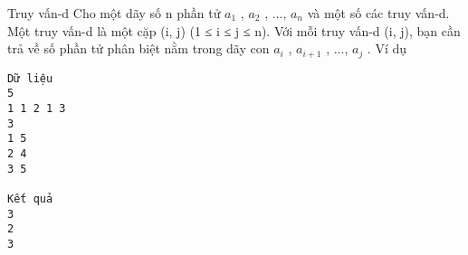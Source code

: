 Truy vấn-d
Cho một dãy số n phần tử $a_{1}$   ,   $a_{2}$   , ..., $a_{n}$   và một số các truy vấn-d. Một truy vấn-d là một cặp (i, j) (1 ≤ i   ≤ j ≤ n). Với mỗi truy vấn-d (i, j), bạn cần trả về số phần   tử phân biệt nằm trong dãy con $a_{i}$   ,   $a_{i+1}$   , ..., $a_{j}$   .
Ví dụ
\begin{verbatim}
Dữ liệu
5
1 1 2 1 3
3
1 5
2 4
3 5

Kết quả
3
2
3 
\end{verbatim}
